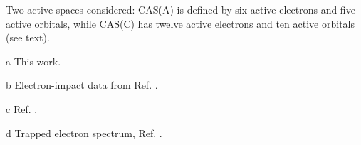 \begin{center}
\begin{threeparttable}
{Two active spaces considered: CAS(A) is defined by six active electrons and five active orbitals,
while CAS(C) has twelve active electrons and ten active orbitals (see
text).\label{tbl:vertexc_form_npi}}
\begin{tablenotes}
\footnotesize
\item[a] This work.
\item[b] Electron-impact data from Ref. .
\item[c] Ref. .
\item[d] Trapped electron spectrum, Ref. .
\end{tablenotes}
\end{threeparttable}
\end{center}
